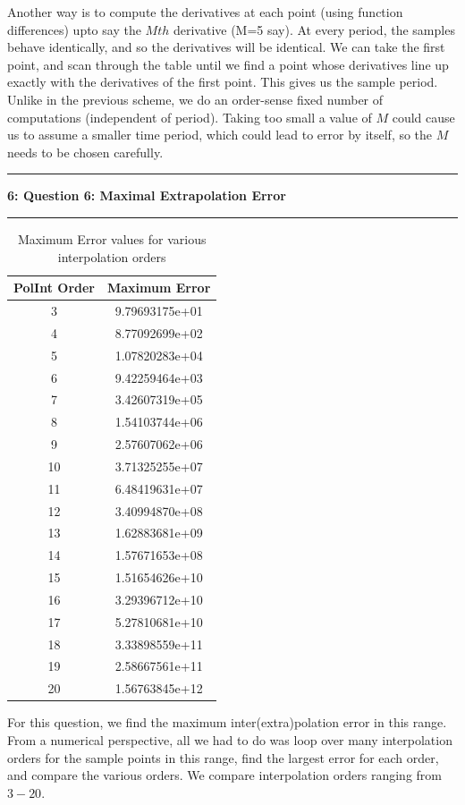 \documentclass[11pt]{article}
\newcommand\question[2]{\vspace{.25in}\hrule\textbf{#1: #2}\vspace{.5em}\hrule\vspace{.10in}}
\begin{document}
Another way is to compute the derivatives at each point (using function differences) upto say the $Mth$ derivative (M=5 say). At every period, the samples behave identically, and so the derivatives will be identical. We can take the first point, and scan through the table until we find a point whose derivatives line up exactly with the derivatives of the first point. This gives us the sample period. Unlike in the previous scheme, we do an order-sense fixed number of computations (independent of period). Taking too small a value of $M$ could cause us to assume a smaller time period, which could lead to error by itself, so the $M$ needs to be chosen carefully. 

\question{6}{Question 6: Maximal Extrapolation Error}

\begin{table}
\caption{Maximum Error values for various interpolation orders}
\renewcommand{\arraystretch}{1.0}
\label{tab:1}
\begin{tabular}{c|c} \toprule
PolInt Order & Maximum Error \\\midrule
3 & 9.79693175e+01 \\  
4 & 8.77092699e+02 \\  
5 & 1.07820283e+04 \\  
6 & 9.42259464e+03 \\  
7 & 3.42607319e+05 \\  
8 & 1.54103744e+06 \\  
9 & 2.57607062e+06 \\  
10 & 3.71325255e+07 \\  
11 & 6.48419631e+07 \\  
12 & 3.40994870e+08 \\  
13 & 1.62883681e+09 \\  
14 & 1.57671653e+08 \\  
15 & 1.51654626e+10 \\  
16 & 3.29396712e+10 \\  
17 & 5.27810681e+10 \\  
18 & 3.33898559e+11 \\  
19 & 2.58667561e+11 \\  
20 & 1.56763845e+12 \\  \bottomrule
\end{tabular}
\end{table} 


For this question, we find the maximum inter(extra)polation error in this range. From a numerical perspective, all we had to do was loop over many interpolation orders for the sample points in this range, find the largest error for each order, and compare the various orders. We compare interpolation orders ranging from $3-20$. 
\end{document}
